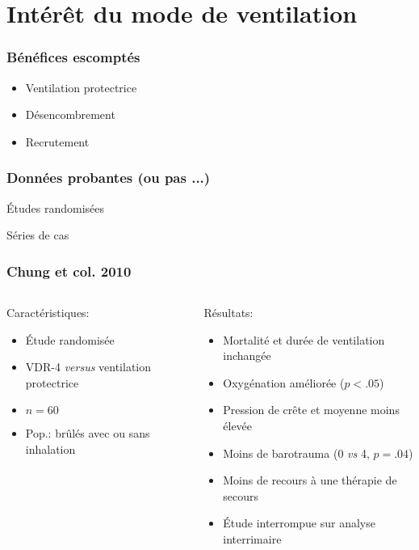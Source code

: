 \section{Intérêt du mode de ventilation}

\begin{frame}
	\frametitle{Bénéfices escomptés}
	{\Large
	\begin{itemize}
		\item Ventilation protectrice
		\item Désencombrement
		\item Recrutement
	\end{itemize}
	}

\end{frame}

\begin{frame}
	\frametitle{Données probantes (ou pas ...)}

	\begin{block}{Études randomisées}
	
	\end{block}

	\begin{block}{Séries de cas}
	
	\end{block}
\end{frame}

\begin{frame}
	\frametitle{Chung et col. 2010}
	\begin{columns}[onlytextwidth]
	\begin{block}{Caractéristiques:}

	\begin{itemize}
		\item Étude randomisée
		\item VDR-4 \textit{versus} ventilation protectrice
		\item $n=60$
		\item Pop.: brûlés avec ou sans inhalation
	\end{itemize}
	\end{block}

	\begin{block}{Résultats:}

	\begin{itemize}
		\item Mortalité et durée de ventilation inchangée
		\item Oxygénation améliorée ($p < .05$)
		\item Pression de crête et moyenne moins élevée
		\item Moins de barotrauma (0 \textit{vs} 4, $p=.04$)
		\item Moins de recours à une thérapie de secours
		\item Étude interrompue sur analyse interrimaire
	\end{itemize}
	\end{block}
	
	\end{columns}
\end{frame}

